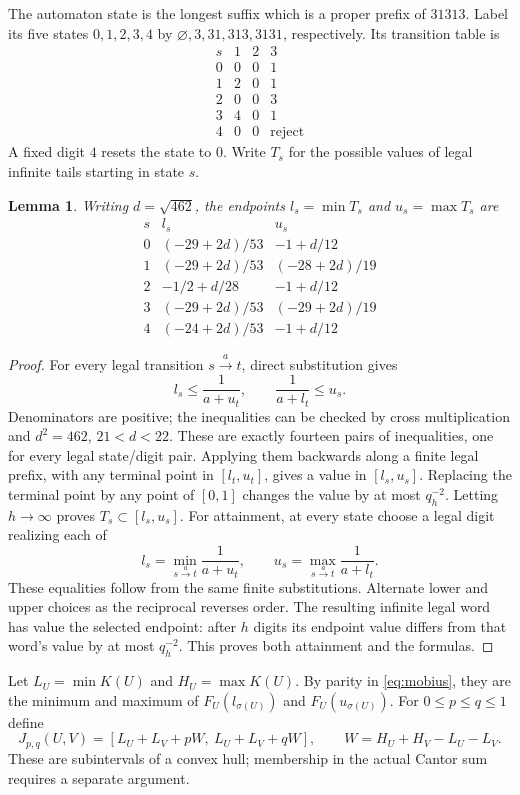 \documentclass[11pt,a4paper]{article}
\newtheorem{lemma}[theorem]{Lemma}
\begin{document}
The automaton state is the longest suffix which is a proper prefix of
$31313$. Label its five states $0,1,2,3,4$ by
$\varnothing,3,31,313,3131$, respectively. Its transition table is
\[
\begin{array}{c|ccc}
 s&1&2&3\\\hline
 0&0&0&1\\1&2&0&1\\2&0&0&3\\3&4&0&1\\4&0&0&\text{reject}
\end{array}
\]
A fixed digit $4$ resets the state to $0$. Write $T_s$ for the possible
values of legal infinite tails starting in state $s$.

\begin{lemma}\label{lem:extrema}
Writing $d=\sqrt{462}$, the endpoints $l_s=\min T_s$ and
$u_s=\max T_s$ are
\[
\begin{array}{c|cc}
 s&l_s&u_s\\\hline
0&(-29+2d)/53&-1+d/12\\
1&(-29+2d)/53&(-28+2d)/19\\
2&-1/2+d/28&-1+d/12\\
3&(-29+2d)/53&(-29+2d)/19\\
4&(-24+2d)/53&-1+d/12
\end{array}
\]
\end{lemma}
\begin{proof}
For every legal transition $s\xrightarrow{a}t$, direct substitution gives
\[
 l_s\le\frac1{a+u_t},\qquad \frac1{a+l_t}\le u_s.
\]
Denominators are positive; the inequalities can be checked by
cross multiplication and $d^2=462$, $21<d<22$.
These are exactly fourteen pairs of inequalities, one for every legal
state/digit pair. Applying them backwards along a finite legal prefix,
with any terminal point in $[l_t,u_t]$, gives a value in $[l_s,u_s]$.
Replacing the terminal point by any point of $[0,1]$ changes the value
by at most $q_h^{-2}$. Letting $h\to\infty$ proves $T_s\subset[l_s,u_s]$.
For attainment, at every state choose a legal digit realizing each of
\[
 l_s=\min_{s\xrightarrow{a}t}\frac1{a+u_t},\qquad
 u_s=\max_{s\xrightarrow{a}t}\frac1{a+l_t}.
\]
These equalities follow from the same finite substitutions.
Alternate lower and upper choices as the reciprocal reverses order.
The resulting infinite legal word has value the selected endpoint:
after $h$ digits its endpoint value differs from that word's value by
at most $q_h^{-2}$. This proves both attainment and the formulas.
\end{proof}
Let $L_U=\min K(U)$ and $H_U=\max K(U)$.
By parity in \eqref{eq:mobius}, they are the minimum and maximum of
$F_U(l_{\sigma(U)})$ and $F_U(u_{\sigma(U)})$.
For $0\le p\le q\le1$ define
\begin{equation}\label{eq:band}
 J_{p,q}(U,V)=[L_U+L_V+pW,\ L_U+L_V+qW],\qquad
 W=H_U+H_V-L_U-L_V.
\end{equation}
These are subintervals of a convex hull; membership in the actual Cantor
sum requires a separate argument.
\end{document}

